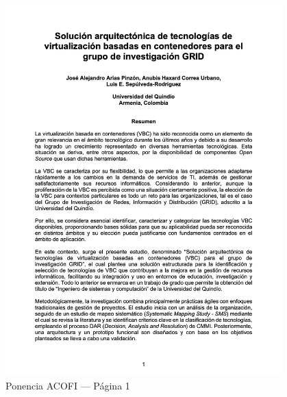 \begin{figure}[H]
	\centering
	\begin{tcolorbox}[
			colback=white,
			colframe=gray!50,
			boxrule=1pt,
			arc=2pt,
			boxsep=5pt,
			left=3pt,
			right=3pt,
			top=3pt,
			bottom=3pt,
			drop shadow
		]
		\includegraphics[width=0.95\textwidth,keepaspectratio]{apendices/ACOFI/pagina_1.png}
	\end{tcolorbox}
	\caption{Ponencia ACOFI --- Página 1}\label{fig:acofi-pagina-1}
\end{figure}
\FloatBarrier%
